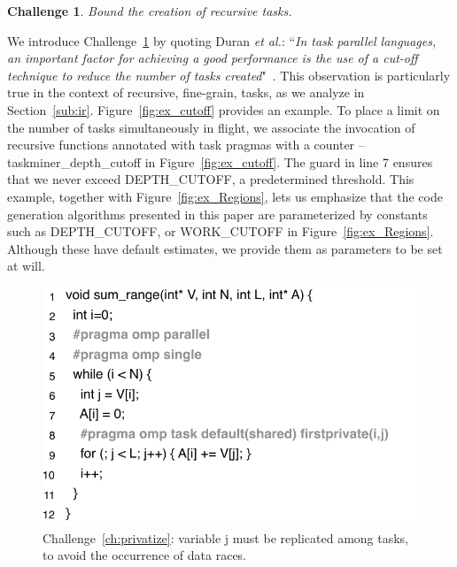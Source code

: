 \documentclass[sigplan,10pt,review,anonymous]{acmart}
\newtheorem{Challenge}{Challenge}[section]
\begin{document}
\begin{Challenge}
\label{ch:cutoff}
Bound the creation of recursive tasks.
\end{Challenge}

We introduce Challenge~\ref{ch:cutoff} by quoting Duran {\em et al.}:
``{\em In task parallel languages, an important factor for achieving a good
performance is the use of a cut-off technique to reduce the number of tasks
created}"~\cite{Duran08b}.
This observation is particularly true in the context of recursive, fine-grain,
tasks, as we analyze in Section~\ref{sub:ir}.
Figure~\ref{fig:ex_cutoff} provides an example.
To place a limit on the number of tasks simultaneously in flight, we associate
the invocation of recursive functions annotated with task pragmas with a
counter -- \textsf{taskminer\_depth\_cutoff} in Figure~\ref{fig:ex_cutoff}.
The guard in line 7 ensures that we never exceed \textsf{DEPTH\_CUTOFF}, a
predetermined threshold.
This example, together with Figure~\ref{fig:ex_Regions}, lets us emphasize that
the code generation algorithms presented in this paper are
parameterized by constants such as \textsf{DEPTH\_CUTOFF}, or
\textsf{WORK\_CUTOFF} in Figure~\ref{fig:ex_Regions}. Although these
have default estimates, we provide them as parameters to be set at will.

\begin{figure}[h!]
\begin{center}
\includegraphics[width=1\columnwidth]{images/ex_privatize}
\caption{Challenge~\ref{ch:privatize}: variable \textsf{j} must be replicated among
tasks, to avoid the occurrence of data races.}
\label{fig:ex_privatize}
\end{center}
\end{figure}
\end{document}
